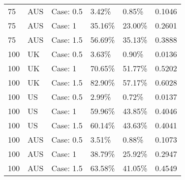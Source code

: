 \begin{table}[ht]
\begin{tabular}{llllll}
  75 & AUS & Case: 0.5 & 3.42\% & 0.85\% & 0.1046 \\ 
  75 & AUS & Case: 1 & 35.16\% & 23.00\% & 0.2601 \\ 
  75 & AUS & Case: 1.5 & 56.69\% & 35.13\% & 0.3888 \\ 
  100 & UK & Case: 0.5 & 3.63\% & 0.90\% & 0.0136 \\ 
  100 & UK & Case: 1 & 70.65\% & 51.77\% & 0.5202 \\ 
  100 & UK & Case: 1.5 & 82.90\% & 57.17\% & 0.6028 \\ 
  100 & US & Case: 0.5 & 2.99\% & 0.72\% & 0.0137 \\ 
  100 & US & Case: 1 & 59.96\% & 43.85\% & 0.4046 \\ 
  100 & US & Case: 1.5 & 60.14\% & 43.63\% & 0.4041 \\ 
  100 & AUS & Case: 0.5 & 3.51\% & 0.88\% & 0.1073 \\ 
  100 & AUS & Case: 1 & 38.79\% & 25.92\% & 0.2947 \\ 
  100 & AUS & Case: 1.5 & 63.58\% & 41.05\% & 0.4549 \\ 
   \hline
\end{tabular}
\end{table}
